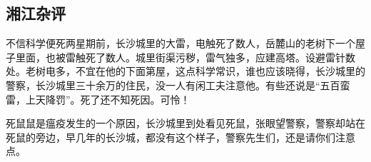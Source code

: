 \subsection{湘江杂评}

不信科学便死两星期前，长沙城里的大雷，电触死了数人，岳麓山的老树下一个屋子里面，也被雷触死了数人。城里街渠污秽，雷气独多，应建高塔。设避雷针数处。老树电多，不宜在他的下面第屋，这点科学常识，谁也应该晓得，长沙城里的警察，长沙城里三十余万的住民，没一人有闲工夫注意他。有些还说是“五百蛮雷，上天降罚”。死了还不知死因。可怜！

死鼠鼠是瘟疫发生的一个原因，长沙城里到处看见死鼠，张眼望警察，警察却站在死鼠的旁边，早几年的长沙城，都没有这个样子，警察先生们，还是请你们注意点。
